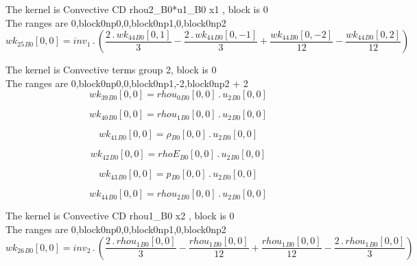 \documentclass{article}
\begin{document}
\noindent The kernel is Convective CD rhou2_B0*u1_B0 x1 , block is 0\\\noindent The ranges are 0,block0np0,0,block0np1,0,block0np2\\\begin{dmath}{wk_{25}{_{B0}}}[{0,0}] = inv_1 \,.\, \left(\frac{2 \,.\, {wk_{44}{_{B0}}}[{0,1}]}{3} - \frac{2 \,.\, {wk_{44}{_{B0}}}[{0,-1}]}{3} + \frac{{wk_{44}{_{B0}}}[{0,-2}]}{12} - \frac{{wk_{44}{_{B0}}}[{0,2}]}{12}\right)\end{dmath}

\noindent The kernel is Convective terms group 2, block is 0\\\noindent The ranges are 0,block0np0,0,block0np1,-2,block0np2 + 2\\\begin{dmath}{wk_{39}{_{B0}}}[{0,0}] = {rhou_{0}{_{B0}}}[{0,0}] \,.\, {u_{2}{_{B0}}}[{0,0}]\end{dmath}

\begin{dmath}{wk_{40}{_{B0}}}[{0,0}] = {rhou_{1}{_{B0}}}[{0,0}] \,.\, {u_{2}{_{B0}}}[{0,0}]\end{dmath}

\begin{dmath}{wk_{41}{_{B0}}}[{0,0}] = {\rho{_{B0}}}[{0,0}] \,.\, {u_{2}{_{B0}}}[{0,0}]\end{dmath}

\begin{dmath}{wk_{42}{_{B0}}}[{0,0}] = {rhoE{_{B0}}}[{0,0}] \,.\, {u_{2}{_{B0}}}[{0,0}]\end{dmath}

\begin{dmath}{wk_{43}{_{B0}}}[{0,0}] = {p{_{B0}}}[{0,0}] \,.\, {u_{2}{_{B0}}}[{0,0}]\end{dmath}

\begin{dmath}{wk_{44}{_{B0}}}[{0,0}] = {rhou_{2}{_{B0}}}[{0,0}] \,.\, {u_{2}{_{B0}}}[{0,0}]\end{dmath}

\noindent The kernel is Convective CD rhou1_B0 x2 , block is 0\\\noindent The ranges are 0,block0np0,0,block0np1,0,block0np2\\\begin{dmath}{wk_{26}{_{B0}}}[{0,0}] = inv_2 \,.\, \left(\frac{2 \,.\, {rhou_{1}{_{B0}}}[{0,0}]}{3} - \frac{{rhou_{1}{_{B0}}}[{0,0}]}{12} + \frac{{rhou_{1}{_{B0}}}[{0,0}]}{12} - \frac{2 \,.\, {rhou_{1}{_{B0}}}[{0,0}]}{3}\right)\end{dmath}
\end{document}
